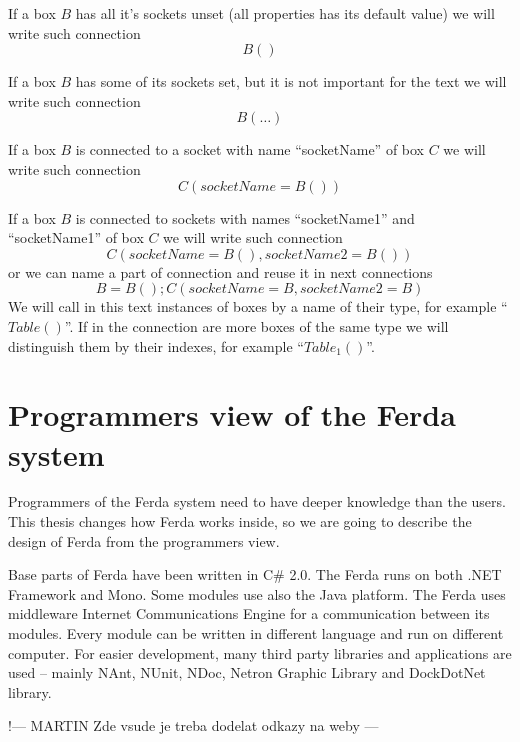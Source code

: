 \documentclass[a4paper,12pt]{book}
\begin{document}
If a box $B$ has all it's sockets unset (all properties has its default value) we will write such connection
\begin{equation}
B()
\end{equation}

If a box $B$ has some of its sockets set, but it is not important for the text we will write such connection
\begin{equation}
B(\dots)
\end{equation}

If a box $B$ is connected to a socket with name ``socketName'' of box $C$ we will write such connection
\begin{equation}
C(socketName=B())
\end{equation}

If a box $B$ is connected to sockets with names ``socketName1'' and ``socketName1'' of box $C$ we will write such connection
\begin{equation}
C(socketName=B(), socketName2=B())
\end{equation}
or we can name a part of connection and reuse it in next connections
\begin{equation}
B=B(); C(socketName=B, socketName2=B)
\end{equation}
We will call in this text instances of boxes by a name of their type, for example ``$Table()$''. If in the connection are more boxes of the same type we will distinguish them by their indexes, for example ``$Table_1()$''.

\section{Programmers view of the Ferda system}
Programmers of the Ferda system need to have deeper knowledge than the users. This thesis changes how Ferda works inside, so we are going to describe the design of Ferda from the programmers view.

Base parts of Ferda have been written in C\# 2.0. The Ferda runs on both .NET Framework and Mono. Some modules use also the Java platform. The Ferda uses middleware Internet Communications Engine for a communication between its modules. Every module can be written in different language and run on different computer. For easier development, many third party libraries and applications are used -- mainly NAnt, NUnit, NDoc, Netron Graphic Library and DockDotNet library.

!--- MARTIN Zde vsude je treba dodelat odkazy na weby --- 
\end{document}
